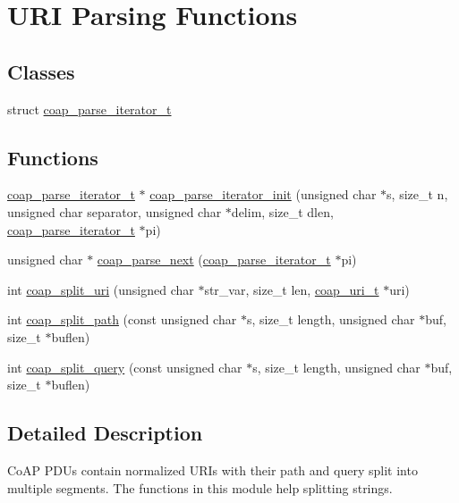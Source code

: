 \hypertarget{group__uri__parse}{}\section{U\+R\+I Parsing Functions}
\label{group__uri__parse}
\subsection*{Classes}
\begin{DoxyCompactItemize}
\item 
struct \hyperlink{structcoap__parse__iterator__t}{coap\+\_\+parse\+\_\+iterator\+\_\+t}
\end{DoxyCompactItemize}
\subsection*{Functions}
\begin{DoxyCompactItemize}
\item 
\hyperlink{structcoap__parse__iterator__t}{coap\+\_\+parse\+\_\+iterator\+\_\+t} $\ast$ \hyperlink{group__uri__parse_gaa794ada6b7c7c6c4009e153924f8e2f8}{coap\+\_\+parse\+\_\+iterator\+\_\+init} (unsigned char $\ast$s, size\+\_\+t n, unsigned char separator, unsigned char $\ast$delim, size\+\_\+t dlen, \hyperlink{structcoap__parse__iterator__t}{coap\+\_\+parse\+\_\+iterator\+\_\+t} $\ast$pi)
\item 
unsigned char $\ast$ \hyperlink{group__uri__parse_ga4c3bd9d741abdb8ea91792af2eb9dc14}{coap\+\_\+parse\+\_\+next} (\hyperlink{structcoap__parse__iterator__t}{coap\+\_\+parse\+\_\+iterator\+\_\+t} $\ast$pi)
\item 
int \hyperlink{group__uri__parse_gad92e0061b8752f304053f59f9da8b62d}{coap\+\_\+split\+\_\+uri} (unsigned char $\ast$str\+\_\+var, size\+\_\+t len, \hyperlink{structcoap__uri__t}{coap\+\_\+uri\+\_\+t} $\ast$uri)
\item 
int \hyperlink{group__uri__parse_gaf908e5dec2807e2591c9d4b7a2e1bdc9}{coap\+\_\+split\+\_\+path} (const unsigned char $\ast$s, size\+\_\+t length, unsigned char $\ast$buf, size\+\_\+t $\ast$buflen)
\item 
int \hyperlink{group__uri__parse_ga11af018953df7b74380791222cc115a5}{coap\+\_\+split\+\_\+query} (const unsigned char $\ast$s, size\+\_\+t length, unsigned char $\ast$buf, size\+\_\+t $\ast$buflen)
\end{DoxyCompactItemize}


\subsection{Detailed Description}
Co\+A\+P P\+D\+Us contain normalized U\+R\+Is with their path and query split into multiple segments. The functions in this module help splitting strings. 

